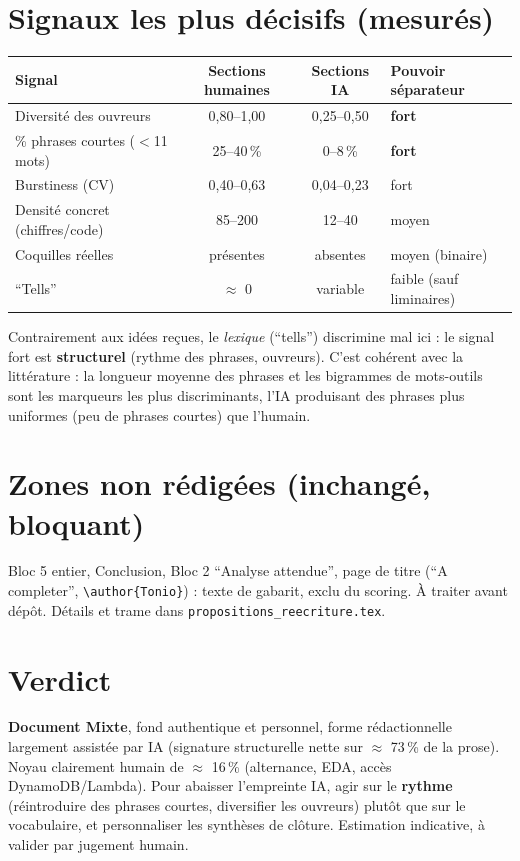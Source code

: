 \documentclass[11pt,a4paper]{article}
\begin{document}
\section{Signaux les plus décisifs (mesurés)}
\begin{center}
\begin{tabularx}{\linewidth}{Y c c Y}
\toprule
Signal & Sections humaines & Sections IA & Pouvoir séparateur \\
\midrule
Diversité des ouvreurs & 0,80--1,00 & 0,25--0,50 & \textbf{fort} \\
\% phrases courtes ($<$11 mots) & 25--40\,\% & 0--8\,\% & \textbf{fort} \\
Burstiness (CV) & 0,40--0,63 & 0,04--0,23 & fort \\
Densité concret (chiffres/code) & 85--200 & 12--40 & moyen \\
Coquilles réelles & présentes & absentes & moyen (binaire) \\
\enquote{Tells} & $\approx$ 0 & variable & faible (sauf liminaires) \\
\bottomrule
\end{tabularx}
\end{center}
\noindent Contrairement aux idées reçues, le \emph{lexique} (\enquote{tells}) discrimine
mal ici : le signal fort est \textbf{structurel} (rythme des phrases, ouvreurs). C'est
cohérent avec la littérature : la longueur moyenne des phrases et les bigrammes de
mots-outils sont les marqueurs les plus discriminants, l'IA produisant des phrases plus
uniformes (peu de phrases courtes) que l'humain.

\section{Zones non rédigées (inchangé, bloquant)}
Bloc 5 entier, Conclusion, Bloc 2 \enquote{Analyse attendue}, page de titre
(\enquote{A completer}, \texttt{\textbackslash author\{Tonio\}}) : texte de gabarit, exclu
du scoring. À traiter avant dépôt. Détails et trame dans \texttt{propositions\_reecriture.tex}.

\section{Verdict}
\textbf{Document Mixte}, fond authentique et personnel, forme rédactionnelle largement
assistée par IA (signature structurelle nette sur $\approx$ 73\,\% de la prose). Noyau
clairement humain de $\approx$ 16\,\% (alternance, EDA, accès DynamoDB/Lambda). Pour
abaisser l'empreinte IA, agir sur le \textbf{rythme} (réintroduire des phrases courtes,
diversifier les ouvreurs) plutôt que sur le vocabulaire, et personnaliser les synthèses
de clôture. Estimation indicative, à valider par jugement humain.
\end{document}

